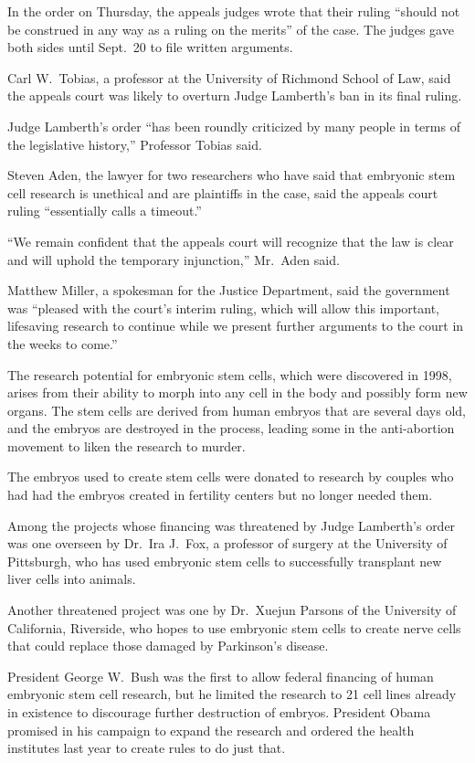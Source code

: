 ﻿\documentclass[12pt]{article}
\begin{document}
In the order on Thursday, the appeals judges wrote that their ruling ``should not be construed in
any way as a ruling on the merits'' of the case. The judges gave both sides until Sept.~20 to file
written arguments.

Carl W.~Tobias, a professor at the University of Richmond School of Law, said the appeals court was
likely to overturn Judge Lamberth's ban in its final ruling.

Judge Lamberth's order ``has been roundly criticized by many people in terms of the legislative
history,'' Professor Tobias said.

Steven Aden, the lawyer for two researchers who have said that embryonic stem cell research is
unethical and are plaintiffs in the case, said the appeals court ruling ``essentially calls a
timeout.''

``We remain confident that the appeals court will recognize that the law is clear and will uphold
the temporary injunction,'' Mr.~Aden said.

Matthew Miller, a spokesman for the Justice Department, said the government was ``pleased with the
court's interim ruling, which will allow this important, lifesaving research to continue while we
present further arguments to the court in the weeks to come.''

The research potential for embryonic stem cells, which were discovered in 1998, arises from their
ability to morph into any cell in the body and possibly form new organs. The stem cells are derived
from human embryos that are several days old, and the embryos are destroyed in the process, leading
some in the anti-abortion movement to liken the research to murder.

The embryos used to create stem cells were donated to research by couples who had had the embryos
created in fertility centers but no longer needed them.

Among the projects whose financing was threatened by Judge Lamberth's order was one overseen by
Dr.~Ira J.~Fox, a professor of surgery at the University of Pittsburgh, who has used embryonic stem
cells to successfully transplant new liver cells into animals.

Another threatened project was one by Dr.~Xuejun Parsons of the University of California, Riverside,
who hopes to use embryonic stem cells to create nerve cells that could replace those damaged by
Parkinson's disease.

President George W.~Bush was the first to allow federal financing of human embryonic stem cell
research, but he limited the research to 21 cell lines already in existence to discourage further
destruction of embryos. President Obama promised in his campaign to expand the research and ordered
the health institutes last year to create rules to do just that.
\end{document}
